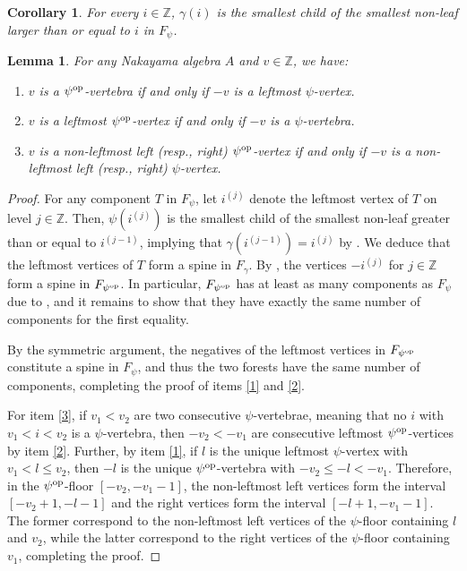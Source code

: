 \documentclass[a4paper]{amsart}
\newtheorem{corollary}[theorem]{Corollary}
\newtheorem{lemma}[theorem]{Lemma}
\theoremstyle{definition}
\theoremstyle{remark}
\numberwithin{equation}{theorem}
\newcommand{\Z}{\mathbb{Z}}
\newcommand{\psiforest}{F_\psi}
\newcommand{\gammaforest}{F_\gamma}
\newcommand{\op}{\textnormal{op}}
\newcommand{\psiop}{\psi^{\op}}
\newcommand{\psiopforest}{F_{\psiop}}
\begin{document}
 \begin{corollary}\label{S-cor}
     For every $ i \in \Z $, $ \gamma(i) $ is the smallest child of the smallest non-leaf larger than or equal to $i$ in $\psiforest$.
 \end{corollary}

\begin{lemma}
    \label{lemma:cyclic:vertices}
    For any Nakayama algebra $A$ and $ v \in \Z $, we have:
    \begin{enumerate}
        \item\label{1} $ v $ is a $ \psi^\op $-vertebra if and only if $ - v $ is a leftmost $ \psi $-vertex.
        \item\label{2} $ v $ is a leftmost $ \psi^\op $-vertex if and only if $ -v $ is a $ \psi $-vertebra.
        \item\label{3} $ v $ is a non-leftmost left (resp., right) $ \psi^\op $-vertex if and only if $ -v $ is a non-leftmost left (resp., right) $ \psi $-vertex.
    \end{enumerate}
\end{lemma}
\begin{proof}
    For any component $ T $ in $ \psiforest $, let $ i^{(j)} $ denote the leftmost vertex of $ T $ on level $ j \in \Z $. Then, $ \psi(i^{(j)}) $ is the smallest child of the smallest non-leaf greater than or equal to $ i^{(j-1)} $, implying that $ \gamma(i^{(j-1)}) = i^{(j)} $ by . We deduce that the leftmost vertices of $ T $ form a spine in $ \gammaforest $. By , the vertices $ -i^{(j)} $ for $ j \in \Z $ form a spine in $ \psiopforest $. In particular, $ \psiopforest $
    has at least as many components as $ \psiforest $ due to , and it remains to show that they have exactly the same number of components for the first equality.

    By the symmetric argument, the negatives of the leftmost vertices in $ \psiopforest $
    constitute a spine in $\psiforest$, and thus the two forests have the same number of components, completing the proof of items \eqref{1} and \eqref{2}.

    For item \eqref{3}, if $ v_1 < v_2 $ are two consecutive $ \psi $-vertebrae, meaning that no $ i $ with $ v_1 < i < v_2 $ is a $ \psi $-vertebra, then $ -v_2 < -v_1 $ are consecutive leftmost $ \psi^\op $-vertices by item \eqref{2}.
    Further, by item \eqref{1}, if $ l $ is the unique leftmost $ \psi $-vertex with $ v_1 < l \leq v_2 $, then $ -l $ is the unique $ \psi^\op $-vertebra with $ -v_2 \leq -l < -v_1 $. Therefore, in the $ \psi^\op $-floor $ [ -v_2 , -v_1-1 ] $, the non-leftmost left vertices form the interval $ [ -v_2+1 , -l-1 ] $ and the right vertices form the interval $ [ -l+1 , -v_1-1 ] $. The former correspond to the non-leftmost left vertices of the $ \psi $-floor containing $ l $ and $ v_2 $, while the latter correspond to the right vertices of the $ \psi $-floor containing $ v_1 $, completing the proof.
\end{proof}
\end{document}
